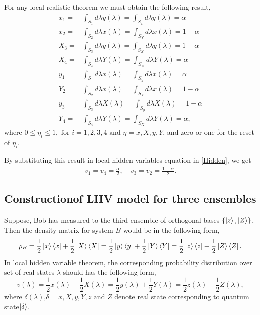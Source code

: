 For any local realistic theorem we must obtain the following result,
\begin{align*}
x_1=&\int_{S_1} d\lambda y(\lambda)=\int_{S_x} d\lambda y(\lambda)=\alpha\\
x_2=&\int_{S_2} d\lambda x(\lambda)=\int_{ S_Y} d\lambda x(\lambda)=1-\alpha\\
X_3=&\int_{S_3} d\lambda y(\lambda)=\int_{S_X } d\lambda y(\lambda)=1-\alpha\\
X_4=&\int_{S_4} d\lambda Y(\lambda)=\int_{S_X} d\lambda Y(\lambda)=\alpha\\
y_1=&\int_{S_1} d\lambda x(\lambda)=\int_{ S_y} d\lambda x(\lambda)=\alpha\\
Y_2=&\int_{S_2} d\lambda x(\lambda)=\int_{ S_Y} d\lambda x(\lambda)=1-\alpha\\
y_3=&\int_{S_3} d\lambda X(\lambda)=\int_{S_y} d\lambda X(\lambda)=1-\alpha\\
Y_4=&\int_{S_4} d\lambda Y(\lambda)=\int_{S_X} d\lambda Y(\lambda)=\alpha,
\end{align*}
where $0\leq \eta_i\leq 1, \text{ for } i=1,2,3,4 \text{ and } \eta= x,X,y,Y$, and zero or one for the reset of $\eta_i$.

By substituting this result in local hidden variables equation in \ref{Hidden}, we get
\begin{align*}
v_1=v_4=\frac{\alpha}{2},\quad v_3=v_2=\frac{1-\alpha}{2}.
\end{align*}






\subsection{Constructionof LHV model for three ensembles}\label{ss3}\hfill \break
Suppose, Bob has measured to the third ensemble of orthogonal bases $\{\ket{z},\ket{Z}\}$, Then the density matrix for system $B$ would be in the following form,
\begin{equation}
\rho_B=\frac{1}{2}\ket{x}\bra{x}+\frac{1}{2}\ket{X}\bra{X}=\frac{1}{2}\ket{y}\bra{y}+\frac{1}{2}\ket{Y}\bra{Y}=\frac{1}{2}\ket{z}\bra{z}+\frac{1}{2}\ket{Z}\bra{Z}.
\end{equation}
In local hidden variable theorem, the corresponding probability distribution over set of real states $\lambda$ should has the following form,
\begin{equation}
v(\lambda)=\frac{1}{2} x(\lambda)+\frac{1}{2} X(\lambda)=\frac{1}{2} y(\lambda)+\frac{1}{2}Y(\lambda)=\frac{1}{2}z(\lambda)+\frac{1}{2}Z(\lambda),
\end{equation}
where $\delta(\lambda)$,$\delta=x,X,y,Y,z \text{ and } Z$ denote real state corresponding to quantum state$\ket{\delta}$.

